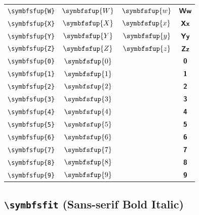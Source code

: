 \documentclass[12pt,a4paper]{article}
\begin{document}
\begin{longtable}{|c|c|c|c|}
\verb|\symbfsfup{W}| & $\symbfsfup{W}$ & $\symbfsfup{w}$ & $ 𝗪 𝘄 $ \\
\verb|\symbfsfup{X}| & $\symbfsfup{X}$ & $\symbfsfup{x}$ & $ 𝗫 𝘅 $ \\
\verb|\symbfsfup{Y}| & $\symbfsfup{Y}$ & $\symbfsfup{y}$ & $ 𝗬 𝘆 $ \\
\verb|\symbfsfup{Z}| & $\symbfsfup{Z}$ & $\symbfsfup{z}$ & $ 𝗭 𝘇 $ \\
\verb|\symbfsfup{0}| & $\symbfsfup{0}$ & & $ 𝟬 $ \\
\verb|\symbfsfup{1}| & $\symbfsfup{1}$ & & $ 𝟭 $ \\
\verb|\symbfsfup{2}| & $\symbfsfup{2}$ & & $ 𝟮 $ \\
\verb|\symbfsfup{3}| & $\symbfsfup{3}$ & & $ 𝟯 $ \\
\verb|\symbfsfup{4}| & $\symbfsfup{4}$ & & $ 𝟰 $ \\
\verb|\symbfsfup{5}| & $\symbfsfup{5}$ & & $ 𝟱 $ \\
\verb|\symbfsfup{6}| & $\symbfsfup{6}$ & & $ 𝟲 $ \\
\verb|\symbfsfup{7}| & $\symbfsfup{7}$ & & $ 𝟳 $ \\
\verb|\symbfsfup{8}| & $\symbfsfup{8}$ & & $ 𝟴 $ \\
\verb|\symbfsfup{9}| & $\symbfsfup{9}$ & & $ 𝟵 $ \\
\hline
\end{longtable}

\newpage

\subsection*{\texttt{\textbackslash{}symbfsfit} (Sans-serif Bold Italic)}
\end{document}
